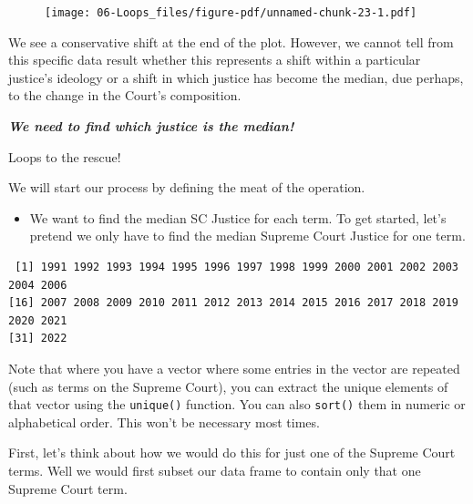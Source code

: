 \documentclass[
  letterpaper,
  DIV=11,
  numbers=noendperiod]{scrreprt}
\newenvironment{Shaded}{\begin{snugshade}}{\end{snugshade}}
\newcommand{\FunctionTok}[1]{\textcolor[rgb]{0.28,0.35,0.67}{#1}}
\newcommand{\NormalTok}[1]{\textcolor[rgb]{0.00,0.23,0.31}{#1}}
\newcommand{\OtherTok}[1]{\textcolor[rgb]{0.00,0.23,0.31}{#1}}
\newcommand{\SpecialCharTok}[1]{\textcolor[rgb]{0.37,0.37,0.37}{#1}}
\providecommand{\tightlist}{%
  \setlength{\itemsep}{0pt}\setlength{\parskip}{0pt}}\usepackage{longtable,booktabs,array}
\begin{document}
\begin{figure}[H]

{\centering \texttt{[image: 06-Loops\_files/figure-pdf/unnamed-chunk-23-1.pdf]}

}

\end{figure}

We see a conservative shift at the end of the plot. However, we cannot
tell from this specific data result whether this represents a shift
within a particular justice's ideology or a shift in which justice has
become the median, due perhaps, to the change in the Court's
composition.

\textbf{\emph{We need to find which justice is the median!}}

Loops to the rescue!

We will start our process by defining the meat of the operation.

\begin{itemize}
\tightlist
\item
  We want to find the median SC Justice for each term. To get started,
  let's pretend we only have to find the median Supreme Court Justice
  for one term.
\end{itemize}

\begin{Shaded}
\end{Shaded}

\begin{verbatim}
 [1] 1991 1992 1993 1994 1995 1996 1997 1998 1999 2000 2001 2002 2003 2004 2006
[16] 2007 2008 2009 2010 2011 2012 2013 2014 2015 2016 2017 2018 2019 2020 2021
[31] 2022
\end{verbatim}

Note that where you have a vector where some entries in the vector are
repeated (such as terms on the Supreme Court), you can extract the
unique elements of that vector using the \texttt{unique()} function. You
can also \texttt{sort()} them in numeric or alphabetical order. This
won't be necessary most times.

First, let's think about how we would do this for just one of the
Supreme Court terms. Well we would first subset our data frame to
contain only that one Supreme Court term.
\end{document}
